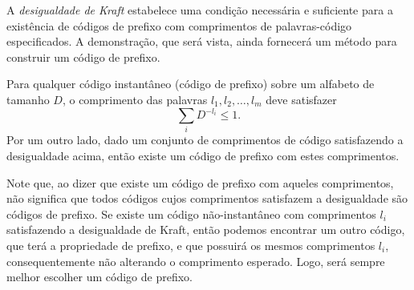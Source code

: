 A \emph{desigualdade de Kraft} estabelece uma condição necessária e suficiente para a
existência de códigos de prefixo com comprimentos de palavras-código
especificados. A demonstração, que será vista, ainda fornecerá um método para
construir um código de prefixo.

\begin{theorem}\label{thm:deskraft}
Para qualquer código instantâneo (código de prefixo) sobre um alfabeto de tamanho $D$, o comprimento
das palavras $l_1, l_2, \ldots, l_m$ deve satisfazer
   \begin{equation}\label{eq:desigualdadekraft}
      \sum_i D^{-l_i} \leq 1 .
   \end{equation}
Por um outro lado, dado um conjunto de comprimentos de código satisfazendo a desigualdade acima,
então existe um código de prefixo com estes comprimentos.
\end{theorem}

Note que, ao dizer que existe um código de prefixo com aqueles comprimentos, não
significa que todos códigos cujos comprimentos satisfazem a desigualdade são
códigos de prefixo. Se existe um código não-instantâneo com comprimentos $l_i$
satisfazendo a desigualdade de Kraft, então podemos encontrar um outro código,
que terá a propriedade de prefixo, e que possuirá os mesmos comprimentos $l_i$,
consequentemente não alterando o comprimento esperado. Logo, será sempre melhor
escolher um código de prefixo.


